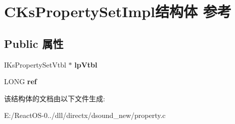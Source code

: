 \hypertarget{struct_c_ks_property_set_impl}{}\section{C\+Ks\+Property\+Set\+Impl结构体 参考}
\label{struct_c_ks_property_set_impl}
\subsection*{Public 属性}
\begin{DoxyCompactItemize}
\item 
\mbox{\label{struct_c_ks_property_set_impl_aeaa69053cdad44df8b9f31cc536e90f3}} 
I\+Ks\+Property\+Set\+Vtbl $\ast$ {\bfseries lp\+Vtbl}
\item 
\mbox{\label{struct_c_ks_property_set_impl_a241fa7096cd05ecc9927bd2db5acd03a}} 
L\+O\+NG {\bfseries ref}
\end{DoxyCompactItemize}


该结构体的文档由以下文件生成\+:\begin{DoxyCompactItemize}
\item 
E\+:/\+React\+O\+S-\/0../dll/directx/dsound\+\_\+new/property.\+c\end{DoxyCompactItemize}
